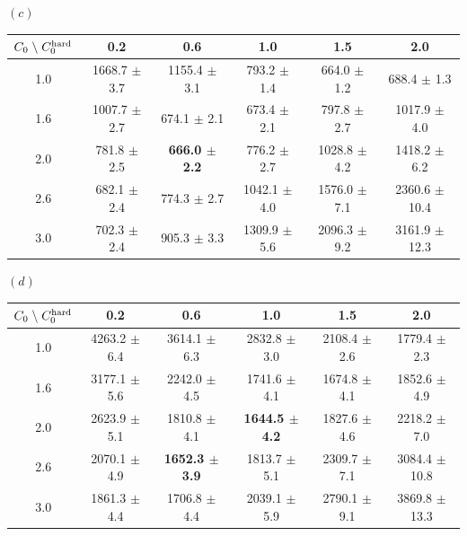 \documentclass[aos,preprint]{imsart}
\theoremstyle{plain}
\theoremstyle{definition}
\begin{document}
\begin{appendix}
\begin{table}[!t]
$(c)$
\begin{tabular}{c|ccccc}
\hline
$C_0\;\backslash \; C_0^{\textup{hard}}$ & 0.2         & 0.6          & 1.0            & 1.5          & 2.0             \\ \hline
1.0   & 1668.7 $\pm$ 3.7 & 1155.4 $\pm$ 3.1 & 793.2 $\pm$ 1.4  & 664.0 $\pm$ 1.2    & 688.4 $\pm$ 1.3   \\
1.6 & 1007.7 $\pm$ 2.7 & 674.1 $\pm$ 2.1  & 673.4 $\pm$ 2.1  & 797.8 $\pm$ 2.7  & 1017.9 $\pm$ 4.0    \\
2.0   & 781.8 $\pm$ 2.5  & \textbf{666.0 $\pm$ 2.2}    & 776.2 $\pm$ 2.7  & 1028.8 $\pm$ 4.2 & 1418.2 $\pm$ 6.2  \\
2.6 & 682.1 $\pm$ 2.4  & 774.3 $\pm$ 2.7  & 1042.1 $\pm$ 4.0   & 1576.0 $\pm$ 7.1   & 2360.6 $\pm$ 10.4 \\
3.0   & 702.3 $\pm$ 2.4  & 905.3 $\pm$ 3.3  & 1309.9 $\pm$ 5.6 & 2096.3 $\pm$ 9.2 & 3161.9 $\pm$ 12.3 \\
 \end{tabular}
 \medskip

$(d)$
\begin{tabular}{c|ccccc}
\hline
$C_0\;\backslash \; C_0^{\textup{hard}}$ & 0.2          & 0.6          & 1.0            & 1.5          & 2.0             \\ \hline
1.0   & 4263.2 $\pm$ 6.4 & 3614.1 $\pm$ 6.3 & 2832.8 $\pm$ 3.0   & 2108.4 $\pm$ 2.6 & 1779.4 $\pm$ 2.3  \\
1.6 & 3177.1 $\pm$ 5.6 & 2242.0 $\pm$ 4.5   & 1741.6 $\pm$ 4.1 & 1674.8 $\pm$ 4.1 & 1852.6 $\pm$ 4.9  \\
2.0   & 2623.9 $\pm$ 5.1 & 1810.8 $\pm$ 4.1 & \textbf{1644.5 $\pm$ 4.2} & 1827.6 $\pm$ 4.6 & 2218.2 $\pm$ 7.0    \\
2.6 & 2070.1 $\pm$ 4.9 & \textbf{1652.3 $\pm$ 3.9} & 1813.7 $\pm$ 5.1 & 2309.7 $\pm$ 7.1 & 3084.4 $\pm$ 10.8 \\
3.0   & 1861.3 $\pm$ 4.4 & 1706.8 $\pm$ 4.4 & 2039.1 $\pm$ 5.9 & 2790.1 $\pm$ 9.1 & 3869.8 $\pm$ 13.3 \\ 
\end{tabular}\\

\medskip


\end{table}
\end{appendix}
\end{document}
